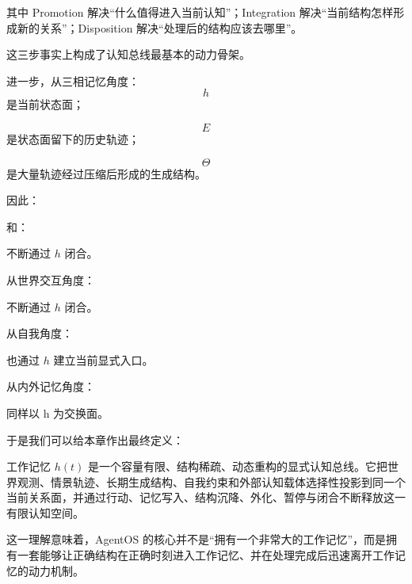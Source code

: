 其中 Promotion 解决“什么值得进入当前认知”；Integration 解决“当前结构怎样形成新的关系”；Disposition 解决“处理后的结构应该去哪里”。

这三步事实上构成了认知总线最基本的动力骨架。

进一步，从三相记忆角度：
\[
h
\]
是当前状态面；

\[
E
\]
是状态面留下的历史轨迹；

\[
\Theta
\]
是大量轨迹经过压缩后形成的生成结构。

因此：
\begin{statementbox}
\centering
{}
\end{statementbox}
和：
\begin{statementbox}
\centering
{}
\end{statementbox}
不断通过 $h$ 闭合。

从世界交互角度：
\begin{statementbox}
\centering
{}
\end{statementbox}
不断通过 $h$ 闭合。

从自我角度：
\begin{statementbox}
\centering
{}
\end{statementbox}
也通过 $h$ 建立当前显式入口。

从内外记忆角度：
\begin{statementbox}
\centering
{}
\end{statementbox}
同样以 h 为交换面。

于是我们可以给本章作出最终定义：

\begin{definition*}
工作记忆 $h(t)$ 是一个容量有限、结构稀疏、动态重构的显式认知总线。它把世界观测、情景轨迹、长期生成结构、自我约束和外部认知载体选择性投影到同一个当前关系面，并通过行动、记忆写入、结构沉降、外化、暂停与闭合不断释放这一有限认知空间。
\end{definition*}

这一理解意味着，AgentOS 的核心并不是“拥有一个非常大的工作记忆”，而是拥有一套能够让正确结构在正确时刻进入工作记忆、并在处理完成后迅速离开工作记忆的动力机制。

